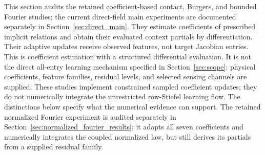 \documentclass[journal]{IEEEtran}
\begin{document}
This section audits the retained coefficient-based contact, Burgers, and
bounded Fourier studies; the current direct-field main experiments are
documented separately in Section~\ref{sec:direct_main}.
They estimate coefficients of prescribed implicit relations
and obtain their evaluated context partials by differentiation. Their adaptive
updates receive observed features, not target Jacobian entries. This is
coefficient estimation with a structured differential evaluation. It is
not the direct all-entry learning mechanism specified in
Section~\ref{sec:scope}: physical
coefficients, feature families, residual levels, and selected sensing channels
are supplied. These studies implement constrained sampled
coefficient updates; they do not numerically integrate the unrestricted
row-Stiefel learning flow. The distinctions below specify what the numerical
evidence can support. The retained normalized Fourier experiment is audited
separately in Section~\ref{sec:normalized_fourier_results}; it adapts all
seven coefficients and numerically integrates the coupled normalized law,
but still derives its partials from a supplied residual family.
\end{document}
